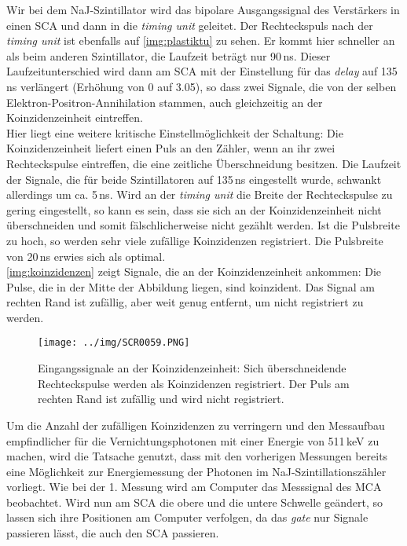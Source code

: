 Wir bei dem NaJ-Szintillator wird das bipolare Ausgangssignal des Verstärkers in einen SCA
und dann in die \emph{timing unit} geleitet.
Der Rechteckspuls nach der \emph{timing unit} ist ebenfalls auf \autoref{img:plastiktu} zu sehen.
Er kommt hier schneller an als beim anderen Szintillator, 
die Laufzeit beträgt nur 90\,ns. Dieser Laufzeitunterschied wird dann am SCA mit der
Einstellung für das \emph{delay} auf 135\,ns verlängert (Erhöhung von 0 auf 3.05),
so dass zwei Signale, die von der selben
Elektron-Positron-Annihilation stammen, auch gleichzeitig an der Koinzidenzeinheit eintreffen.\\
Hier liegt eine weitere kritische Einstellmöglichkeit der Schaltung:
Die Koinzidenzeinheit liefert einen Puls an den Zähler, wenn an ihr zwei Rechteckspulse eintreffen,
die eine zeitliche Überschneidung besitzen.
Die Laufzeit der Signale, die für beide Szintillatoren auf 135\,ns eingestellt wurde,
schwankt allerdings um ca. 5\,ns. Wird an der \emph{timing unit}
die Breite der Rechteckspulse zu gering eingestellt, so
kann es sein, dass sie sich an der Koinzidenzeinheit nicht überschneiden und somit fälschlicherweise nicht
gezählt werden. Ist die Pulsbreite zu hoch, so werden sehr viele zufällige Koinzidenzen registriert.
Die Pulsbreite von 20\,ns erwies sich als optimal.\\
\autoref{img:koinzidenzen} zeigt Signale, die an der Koinzidenzeinheit ankommen:
Die Pulse, die in der Mitte der Abbildung liegen, sind koinzident.
Das Signal am rechten Rand ist zufällig, aber weit genug entfernt, um nicht registriert zu werden.
\begin{figure}[H]
\begin{center}
  \texttt{[image: ../img/SCR0059.PNG]}
  \caption[---]{Eingangssignale an der Koinzidenzeinheit: Sich überschneidende Rechteckspulse werden als 
  Koinzidenzen registriert. Der Puls am rechten Rand ist zufällig und wird nicht registriert.}
  \label{img:koinzidenzen}
\end{center}
\end{figure}
Um die Anzahl der zufälligen Koinzidenzen zu verringern
und den Messaufbau empfindlicher für die Vernichtungsphotonen mit einer Energie von 511\,keV zu machen,
wird die Tatsache genutzt, dass mit den vorherigen Messungen bereits eine Möglichkeit zur
Energiemessung der Photonen im NaJ-Szintillationszähler vorliegt.
Wie bei der 1. Messung wird am Computer das Messsignal des MCA beobachtet.
Wird nun am SCA die obere und die untere Schwelle geändert, so lassen sich ihre Positionen
am Computer verfolgen, da das \emph{gate} nur Signale passieren lässt, die auch den SCA passieren.
